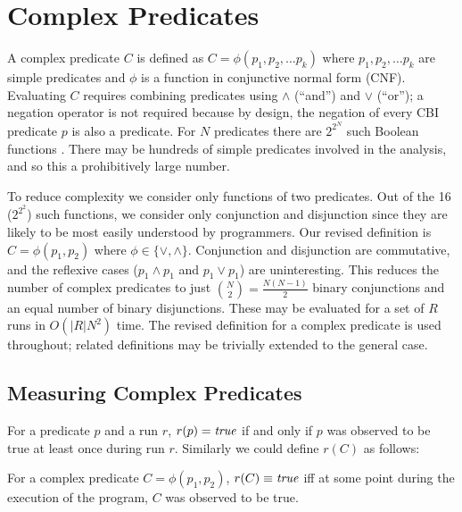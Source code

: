 
\section{Complex Predicates}
\label{sec-complex-preds}
A complex predicate $C$ is defined as $C = \phi(p_1, p_2, \ldots p_k)$ where 
$p_1, p_2, \ldots p_k$ are simple predicates and $\phi$ is a function in 
conjunctive normal form (CNF).  Evaluating $C$ requires combining predicates 
using $\wedge$ (``and'') and $\vee$ (``or''); a negation operator is not required 
because by design, the negation of every CBI predicate $p$ is also a predicate.  
For $N$ predicates there are $2^{2^N}$ such Boolean functions 
\cite{MathWorld:BoolFuncs}.  There may be hundreds of simple predicates involved 
in the analysis, and so this a prohibitively large number.

To reduce complexity we consider only functions of two predicates.  Out of the
16 ($2^{2^2}$) such functions, we consider only conjunction and disjunction since
they are likely to be most easily understood by programmers.  Our revised
definition is $C = \phi(p_1, p_2)$ where $\phi \in \{\vee, \wedge\}$.  Conjunction
and disjunction are commutative, and the reflexive cases ($p_1 \wedge p_1$ and 
$p_1 \vee p_1$) are uninteresting.  This reduces the number of complex predicates
to just ${N \choose 2} = \frac{N (N-1)}{2}$ binary conjunctions and an equal number 
of binary disjunctions.  These may be evaluated for a set of $R$ runs in $O(|R| N^2)$ 
time.  The revised definition for a complex predicate is used throughout; related
definitions may be trivially extended to the general case.

\subsection{Measuring Complex Predicates}
\label{sec-measuring}

For a predicate $p$ and a run $r$, $r(p) = \mathit{true}$ if and only if $p$ was observed to be true at least once during run $r$.  Similarly we could define $r(C)$ as follows:
\begin{defn}
\label{dfn1}
For a complex predicate $C = \phi(p_1, p_2)$, $r(C) \equiv \mathit{true}$ iff at some point during the execution of the program, $C$ was observed to be true.
\end{defn}

